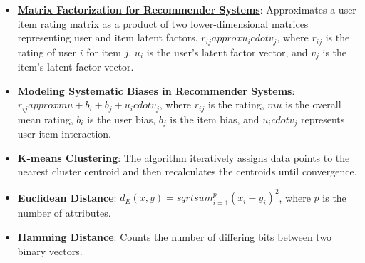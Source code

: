 \documentclass{article}%
\begin{document}
\begin{itemize}[leftmargin=*]
\item \href{https://purdue.brightspace.com/d2l/common/assets/pdfjs-d2l-dist/1.0.14-legacy/web/viewer.html?file=\%2Fcontent\%2Fenforced\%2F1095467-wl.202510.CS.24300.001\%2F11L2-svd-pca-recommender.pdf\%3Fou\%3D1095467\&lang=en-us\&container=d2l-fileviewer-rendered-pdf\&fullscreen=d2l-fileviewer-rendered-pdf-dialog\&height=667#page=36}{\textbf{Matrix Factorization for Recommender Systems}}: Approximates a user-item rating matrix as a product of two lower-dimensional matrices representing user and item latent factors. $r_{ij}  approx u_i  cdot v_j$, where $r_{ij}$ is the rating of user $i$ for item $j$, $u_i$ is the user's latent factor vector, and $v_j$ is the item's latent factor vector.%
\item \href{https://purdue.brightspace.com/d2l/common/assets/pdfjs-d2l-dist/1.0.14-legacy/web/viewer.html?file=\%2Fcontent\%2Fenforced\%2F1095467-wl.202510.CS.24300.001\%2F11L2-svd-pca-recommender.pdf\%3Fou\%3D1095467\&lang=en-us\&container=d2l-fileviewer-rendered-pdf\&fullscreen=d2l-fileviewer-rendered-pdf-dialog\&height=667#page=44}{\textbf{Modeling Systematic Biases in Recommender Systems}}: $r_{ij}  approx  mu + b_i + b_j + u_i  cdot v_j$, where $r_{ij}$ is the rating, $ mu$ is the overall mean rating, $b_i$ is the user bias, $b_j$ is the item bias, and $u_i  cdot v_j$ represents user-item interaction.%
\item \href{https://purdue.brightspace.com/d2l/common/assets/pdfjs-d2l-dist/1.0.14-legacy/web/viewer.html?file=\%2Fcontent\%2Fenforced\%2F1095467-wl.202510.CS.24300.001\%2F12L2-distance-clusters.pdf\%3Fou\%3D1095467\&lang=en-us\&container=d2l-fileviewer-rendered-pdf\&fullscreen=d2l-fileviewer-rendered-pdf-dialog\&height=667#page=22}{\textbf{K-means Clustering}}: The algorithm iteratively assigns data points to the nearest cluster centroid and then recalculates the centroids until convergence.%
\item \href{https://purdue.brightspace.com/d2l/common/assets/pdfjs-d2l-dist/1.0.14-legacy/web/viewer.html?file=\%2Fcontent\%2Fenforced\%2F1095467-wl.202510.CS.24300.001\%2F12L2-distance-clusters.pdf\%3Fou\%3D1095467\&lang=en-us\&container=d2l-fileviewer-rendered-pdf\&fullscreen=d2l-fileviewer-rendered-pdf-dialog\&height=667#page=17}{\textbf{Euclidean Distance}}: $d_E(x, y) =  sqrt{ sum_{i=1}^{p} (x_i - y_i)^2}$, where $p$ is the number of attributes.%
\item \href{https://purdue.brightspace.com/d2l/common/assets/pdfjs-d2l-dist/1.0.14-legacy/web/viewer.html?file=\%2Fcontent\%2Fenforced\%2F1095467-wl.202510.CS.24300.001\%2F12L2-distance-clusters.pdf\%3Fou\%3D1095467\&lang=en-us\&container=d2l-fileviewer-rendered-pdf\&fullscreen=d2l-fileviewer-rendered-pdf-dialog\&height=667#page=19}{\textbf{Hamming Distance}}: Counts the number of differing bits between two binary vectors.%

\end{itemize}
\end{document}
